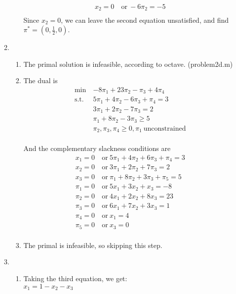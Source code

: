 \documentclass[12pt]{article}
\begin{document}
\begin{enumerate}
\begin{enumerate}
\begin{enumerate}
\begin{equation}
\begin{split}
                x_2=0&\ \text{or}\ -6\pi_2=-5\\
              \end{split}
            \end{equation}
            Since $x_2=0$, we can leave the second equation unsatisfied, and
            find $\pi^*=(0,\frac{1}{2},0)$.\\
        \end{enumerate}
      \item
        \begin{enumerate}
          \item
            The primal solution is infeasible, according to octave. (problem2d.m)
          \item
            The dual is
            \begin{equation}
              \begin{split}
                \text{min}\ &-8\pi_1+23\pi_2-\pi_3+4\pi_4\\
                \text{s.t.}\ &5\pi_1+4\pi_2-6\pi_3+\pi_4=3\\
                &3\pi_1+2\pi_2-7\pi_3=2\\
                &\pi_1+8\pi_2-3\pi_3\geq5\\
                &\pi_2,\pi_3,\pi_4\geq0,\pi_1\ \text{unconstrained}\\
              \end{split}
            \end{equation}

            And the complementary slackness conditions are
            \begin{equation}
              \begin{split}
                x_1=0&\ \text{or}\ 5\pi_1+4\pi_2+6\pi_3+\pi_4=3\\
                x_2=0&\ \text{or}\ 3\pi_1+2\pi_2+7\pi_3=2\\
                x_3=0&\ \text{or}\ \pi_1+8\pi_2+3\pi_3+\pi_5=5\\
                \pi_1=0&\ \text{or}\ 5x_1+3x_2+x_3=-8\\
                \pi_2=0&\ \text{or}\ 4x_1+2x_2+8x_3=23\\
                \pi_3=0&\ \text{or}\ 6x_1+7x_2+3x_3=1\\
                \pi_4=0&\ \text{or}\ x_1=4\\
                \pi_5=0&\ \text{or}\ x_3=0\\
              \end{split}
            \end{equation}
          \item
            The primal is infeasible, so skipping this step.\\
        \end{enumerate}
      \item
        \begin{enumerate}
          \item
            Taking the third equation, we get:\\
            $x_1=1-x_2-x_3$


\end{enumerate}
\end{enumerate}
\end{enumerate}
\end{document}

